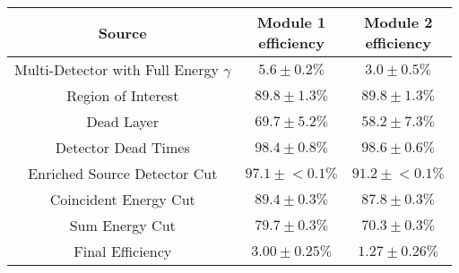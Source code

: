 \begin{tabular}{|c|c|c|}
\hline
  Source & \makecell{Module 1\\efficiency} & \makecell{Module 2\\efficiency} \\
\hline
  \makecell{Multi-Detector with\\Full Energy $\gamma$} & $5.6 \pm 0.2\%$ & $3.0 \pm 0.5\%$ \\
  Region of Interest & $89.8 \pm 1.3\%$ & $89.8 \pm 1.3\%$ \\
  Dead Layer & $69.7 \pm 5.2\%$ & $58.2 \pm 7.3\%$ \\
  Detector Dead Times & $98.4 \pm 0.8\%$ & $98.6 \pm 0.6\%$ \\
  Enriched Source Detector Cut & $97.1 \pm{}<\!0.1\%$ & $91.2 \pm{}<\!0.1\%$ \\
  Coincident Energy Cut & $89.4 \pm 0.3\%$ & $87.8 \pm 0.3\%$ \\
  Sum Energy Cut & $79.7 \pm 0.3\%$ & $70.3 \pm 0.3\%$ \\
  \hline Final Efficiency & $3.00 \pm 0.25\%$ & $1.27 \pm 0.26\%$ \\
\hline
\end{tabular}
